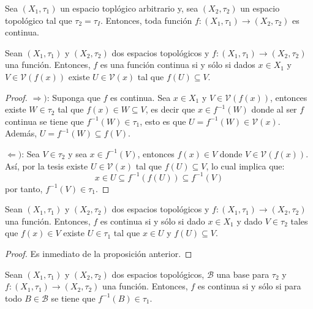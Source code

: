 \documentclass[12pt]{report}
\theoremstyle{largebreak}
\newcommand\cf[3]{\ensuremath{#1:#2\rightarrow#3}}
\newcommand{\V}[1]{\ensuremath{\mathcal{V}(#1)}}
\begin{document}
    \begin{exa}
        Sea $(X_1,\tau_1)$ un espacio toplógico arbitrario y, sea $(X_2,\tau_2)$ un espacio topológico tal que $\tau_2=\tau_I$. Entonces, toda función $\cf{f}{(X_1,\tau_1)}{(X_2,\tau_2)}$ es continua.
    \end{exa}

    \begin{propo}
        Sean $(X_1,\tau_1)$ y $(X_2,\tau_2)$ dos espacios topológicos y $\cf{f}{(X_1,\tau_1)}{(X_2,\tau_2)}$ una función. Entonces, $f$ es una función continua si y sólo si dados $x\in X_1$ y $V\in\V{f(x)}$ existe $U\in\V{x}$ tal que $f(U)\subseteq V$.
    \end{propo}

    \begin{proof}
        $\Rightarrow)$: Suponga que $f$ es continua. Sea $x\in X_1$ y $V\in\V{f(x)}$, entonces existe $W\in\tau_2$ tal que $f(x)\in W\subseteq V$, es decir que $x\in f^{-1}(W)$ donde al ser $f$ continua se tiene que $f^{-1}(W)\in\tau_1$, esto es que $U=f^{-1}(W)\in\V{x}$. Además, $U=f^{-1}(W)\subseteq f(V)$.

        $\Leftarrow)$: Sea $V\in\tau_2$ y sea $x\in f^{-1}(V)$, entonces $f(x)\in V$ donde $V\in\V{f(x)}$. Así, por la tesis existe $U\in \V{x}$ tal que $f(U)\subseteq V$, lo cual implica que:
        \begin{equation*}
            x\in U\subseteq f^{-1}(f(U))\subseteq f^{-1}(V)
        \end{equation*}
        por tanto, $f^{-1}(V)\in\tau_1$.
    \end{proof}

    \begin{cor}
        Sean $(X_1,\tau_1)$ y $(X_2,\tau_2)$ dos espacios topológicos y $\cf{f}{(X_1,\tau_1)}{(X_2,\tau_2)}$ una función. Entonces, $f$ es continua si y sólo si dado $x\in X_1$ y dado $V\in\tau_2$ tales que $f(x)\in V$ existe $U\in\tau_1$ tal que $x\in U$ y $f(U)\subseteq V$.
    \end{cor}

    \begin{proof}
        Es inmediato de la proposición anterior.
    \end{proof}

    \begin{propo}
        Sean $(X_1,\tau_1)$ y $(X_2,\tau_2)$ dos espacios topológicos, $\mathcal{B}$ una base para $\tau_2$ y $\cf{f}{(X_1,\tau_1)}{(X_2,\tau_2)}$ una función. Entonces, $f$ es continua si y sólo si para todo $B\in\mathcal{B}$ se tiene que $f^{-1}(B)\in\tau_1$.
    \end{propo}
\end{document}
